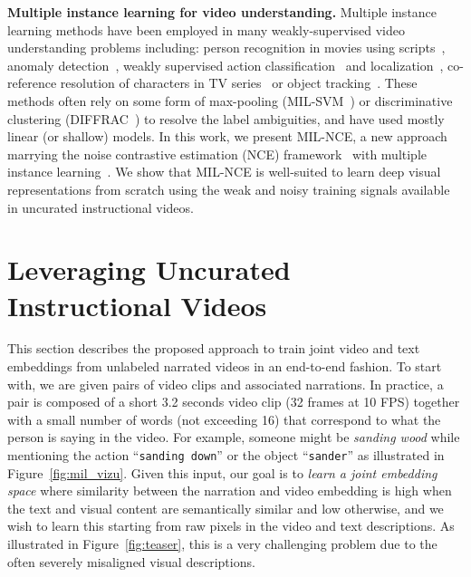 \documentclass[10pt,twocolumn,letterpaper]{article}
\begin{document}
\noindent
\textbf{Multiple instance learning for video understanding.}
Multiple instance learning methods have been employed in many weakly-supervised video understanding problems including:
person recognition in movies using scripts~\cite{bojanowski13finding,miech17learning,parkhi15it}, anomaly detection~\cite{sultani2018real},
weakly supervised action classification~\cite{leung2011handling,shapovalova12similarity} and localization~\cite{cheron2018flexible,duchenne09automatic,weinzaepfel16towards}, co-reference resolution of characters in TV series~\cite{ramanathan14linking} or object tracking~\cite{babenko2009visual}.
These methods often rely on some form of max-pooling (\ie MIL-SVM~\cite{andrews2003support}) or discriminative clustering (\ie DIFFRAC~\cite{bach07diffrac}) to resolve the label ambiguities, and have used mostly linear (or shallow) models. In this work, we present MIL-NCE, a new approach marrying the noise contrastive estimation (NCE) framework~\cite{gutmann2010noise} with multiple instance learning~\cite{dietterich1997solving}. We show that MIL-NCE is well-suited to learn deep visual representations from scratch using the weak and noisy training signals available in uncurated instructional videos.


\section{Leveraging Uncurated Instructional Videos}


This section describes the proposed approach to train joint video and text embeddings from unlabeled narrated videos in an end-to-end fashion.
To start with, we are given  pairs of video clips and associated narrations.
In practice, a pair is composed of a short 3.2 seconds video clip (32 frames at 10 FPS) together with a small number of words (not exceeding 16) that correspond to what the person is saying in the video.
For example, someone might be \emph{sanding wood} while mentioning the action ``\texttt{sanding down}'' or the object ``\texttt{sander}'' as illustrated in Figure~\ref{fig:mil_vizu}.
Given this input, our goal is to {\em learn a joint embedding space}  where similarity between the narration and video embedding is high when the text and visual content are semantically similar and low otherwise,
and we wish to learn this starting from raw pixels in the video and text descriptions.
As illustrated in Figure~\ref{fig:teaser}, this is a very challenging
problem due to the often severely misaligned visual descriptions.
\end{document}
